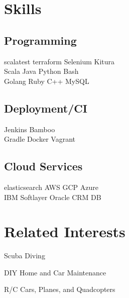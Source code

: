 \documentclass[letterpaper]{resume} %
\begin{document}
\begin{minipage}[t]{0.33\textwidth}
\sectionspace %


\section{Skills}

\subsection{Programming}

scalatest \textbullet{} terraform \textbullet{} Selenium \textbullet{} Kitura \\
\sectionspace
{}
Scala \textbullet{} Java \textbullet{} Python \textbullet{} Bash \\

\sectionspace
{}
Golang \textbullet{} Ruby \textbullet{} C++ \textbullet{} MySQL \\

\sectionspace

\subsection{Deployment/CI}
Jenkins \textbullet{} Bamboo\\
Gradle \textbullet{} Docker \textbullet{} Vagrant\\ 

\sectionspace %

\subsection{Cloud Services}
elasticsearch \textbullet{} AWS \textbullet{} GCP \textbullet{} Azure\\
IBM Softlayer \textbullet{} Oracle CRM DB\\



\section{Related Interests}
\sectionspace %
\begin{tightitemize}
\item Scuba Diving
\item DIY Home and Car Maintenance
\item R/C Cars, Planes, and Quadcopters
\end{tightitemize}


\end{minipage} %
\end{document}
